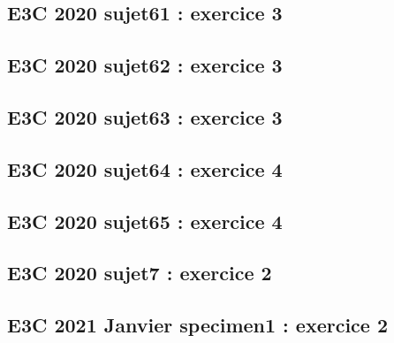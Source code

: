 \documentclass[lang=fr,edition=teacher,layout=sheet]{mxbook}
\begin{document}
\par\bigskip
{}\subsection*{E3C 2020 sujet61 : exercice 3}
\begingroup\endgroup
\par\bigskip
{}\subsection*{E3C 2020 sujet62 : exercice 3}
\begingroup\endgroup
\par\bigskip
{}\subsection*{E3C 2020 sujet63 : exercice 3}
\begingroup\endgroup
\par\bigskip
{}\subsection*{E3C 2020 sujet64 : exercice 4}
\begingroup\endgroup
\par\bigskip
{}\subsection*{E3C 2020 sujet65 : exercice 4}
\begingroup\endgroup
\par\bigskip
{}\subsection*{E3C 2020 sujet7 : exercice 2}
\begingroup\endgroup
\par\bigskip
{}\subsection*{E3C 2021 Janvier specimen1 : exercice 2}
\begingroup\endgroup
\par\bigskip
\end{document}
